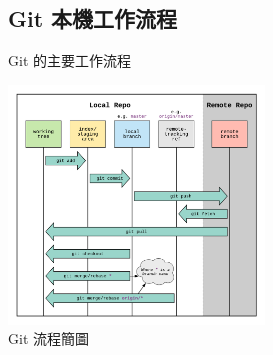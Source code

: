 \documentclass[xetex, unicode, 10pt, aspectratio=169]{beamer}
\begin{document}
\subsection{Git 本機工作流程}

\begin{frame}{Git 的主要工作流程}
    \begin{center}
        \includegraphics[height=2.5in]{./img/git-workflow.png}\\
        Git 流程簡圖
    \end{center}
\end{frame}
\end{document}
